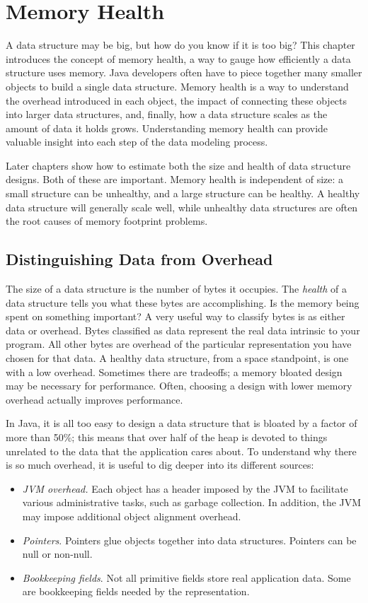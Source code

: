 \documentclass{book}
\theoremstyle{definition}
\begin{document}
\chapter{Memory Health}

A data structure may be big, but how do you know if it is too big? This chapter introduces the concept of memory health, a way to gauge how efficiently a data structure uses memory. Java developers often have to piece together many smaller objects to build a single data structure. Memory health is a way to understand the overhead introduced in each object, the impact of connecting these objects into larger data structures, and, finally, how a data structure scales as the amount of data it holds grows. Understanding memory health can provide valuable insight into each step of the data modeling process.

Later chapters show how to estimate both the size and health of data structure designs. Both of these are important. Memory health is independent of size: a small structure can be unhealthy, and a large structure can be healthy. A healthy data structure will generally scale well, while unhealthy data structures are often the root causes of memory footprint problems. 


\section{Distinguishing Data from Overhead}

The size of a data structure is the number of bytes it occupies. The \emph{health} of a data structure tells you what these bytes are accomplishing. Is the memory being spent on something important?  A very useful way to classify bytes is as either data or overhead. Bytes classified as data represent the real data intrinsic to your program. All other bytes are overhead of the particular representation you have chosen for that data. A healthy data structure, from a space standpoint, is one with a low overhead.  Sometimes there are tradeoffs; a memory bloated design may be necessary for performance. Often, choosing a design with lower memory overhead actually improves performance.

In Java, it is all too easy to design a data structure that is bloated by a factor of more than 50\%; this means that over half of the heap is devoted to things unrelated to the data that the application cares about. To understand why there is so much overhead, it is useful to dig deeper into its different sources:  
\begin{itemize}
\item \emph{JVM overhead.} Each object has a header imposed by the JVM to facilitate various administrative tasks, such as garbage collection. In addition, the JVM may impose additional object alignment overhead.
\item \emph{Pointers}. Pointers glue objects together into data structures. Pointers can be null or non-null.   
\item \emph{Bookkeeping fields}. Not all primitive fields store real application data. Some are bookkeeping fields needed by the representation. 
\end{itemize}
\end{document}
